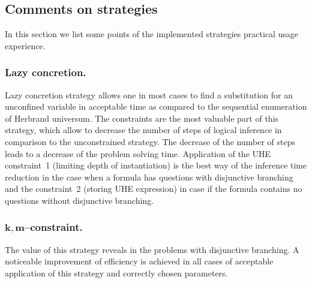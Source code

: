 \documentclass[runningheads,a4paper]{llncs}
\begin{document}









\subsection{Comments on strategies}

In this section we list some points of the implemented strategies practical usage experience.

\subsubsection{Lazy concretion.}
Lazy concretion strategy allows one in most cases to find a substitution for an unconfined variable in acceptable time as compared to the sequential enumeration of Herbrand universum. The constraints are the most valuable part of this strategy, which allow to decrease the number of steps of logical inference in comparison to the unconstrained strategy. The decrease of the number of steps leads to a decrease of the problem solving time. Application of the UHE constraint~1 (limiting depth of instantiation) is the best way of the inference time reduction in the case when a formula has questions with disjunctive branching and the constraint~2 (storing UHE expression) in case if the formula contains no questions without disjunctive branching.


\subsubsection{$\boldsymbol{k,m}$--constraint.}
The value of this strategy reveals in the problems with disjunctive branching. A noticeable improvement of efficiency is achieved in all cases of acceptable application of this strategy and correctly chosen parameters.
\end{document}
